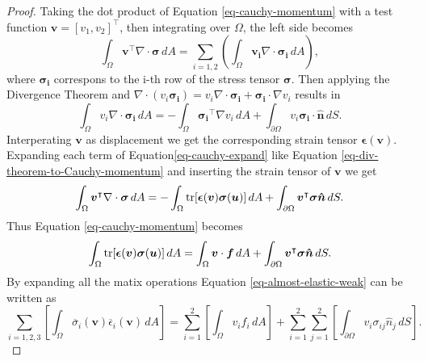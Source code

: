 \documentclass[11pt,a4paper,english]{elsarticle}%
\begin{document}
\begin{proof}
Taking the dot product of  Equation \eqref{eq-cauchy-momentum} with a test function $\boldsymbol{v} = [v_1, v_2]^\intercal$, then integrating over $\Omega$, the left side becomes
\begin{equation} \label{eq-cauchy-expand}
    \int_\Omega{\boldsymbol{v}^\intercal \nabla \cdot \boldsymbol{\sigma}} \,dA = \sum_{i = 1,2}\left(\int_\Omega{\boldsymbol{v_i} \nabla \cdot \boldsymbol{\sigma_i}} \,dA \right),
\end{equation}
where $\boldsymbol{\sigma_i}$ correspons to the i-th row of the stress tensor $\boldsymbol{\sigma}$. 
Then applying the Divergence Theorem and $\nabla \cdot (v_i \boldsymbol{\sigma_i})  = v_i \nabla \cdot \boldsymbol{\sigma_i} + \boldsymbol{\sigma_i} \cdot \nabla v_i$ results in 
\begin{equation} \label{eq-div-theorem-to-Cauchy-momentum}
    \int_\Omega{{v_i} \nabla \cdot \boldsymbol{\sigma_i}}  \,dA = -\int_\Omega{\boldsymbol{\sigma_i}^\intercal \nabla v_i}  \,dA +  \int_{\partial \Omega}{v_i \boldsymbol{\sigma_i} \cdot \boldsymbol{\hat{n}} }  \,dS.
\end{equation}
Interperating $\boldsymbol{v}$ as displacement we get the corresponding strain tensor $\boldsymbol{\epsilon} (\boldsymbol v)$. Expanding each term of Equation\eqref{eq-cauchy-expand} like Equation \eqref{eq-div-theorem-to-Cauchy-momentum} and inserting the strain tensor of $\boldsymbol{v}$ we get
\begin{equation}\label{eq-elastic-weak-left}
    \int_\Omega{\boldsymbol{v}^\intercal \nabla \cdot \boldsymbol{\sigma}} \,dA = -\int_\Omega{\tr[ \boldsymbol{\epsilon}(\boldsymbol v)\boldsymbol{\sigma}(\boldsymbol u)]} \,dA + \int_{\partial \Omega}{\boldsymbol{v}^\intercal \boldsymbol{\sigma}}\boldsymbol{\hat{n} } \,dS.
\end{equation}
Thus Equation \eqref{eq-cauchy-momentum} becomes
\begin{equation} \label{eq-almost-elastic-weak}
    \int_\Omega{\tr[ \boldsymbol{\epsilon}(\boldsymbol v)\boldsymbol{\sigma}(\boldsymbol u)]} \,dA  = \int_\Omega{\boldsymbol{v} \cdot  \boldsymbol{f}} \,dA + \int_{\partial \Omega}{\boldsymbol{v}^\intercal \boldsymbol{\sigma}}\boldsymbol{\hat{n} } \,dS.
\end{equation}
By expanding all the matix operations Equation \eqref{eq-almost-elastic-weak} can be written as 
\begin{equation}
    \sum_{i = 1,2,3} \left[\int_\Omega{ \overline{\sigma}_i(\boldsymbol v) \overline{\epsilon}_i(\boldsymbol v)}   \,dA \right] = \sum_{i = 1}^2 \left[\int_\Omega{ v_i f_i}   \,dA \right] + \sum_{i = 1}^{2}{{\sum_{j = 1}^{2} \left[\int_{\partial \Omega}{ v_i \sigma_{ij} \hat{n}_j}   \,dS \right]}}. 

\end{equation}
\end{proof}
\end{document}
